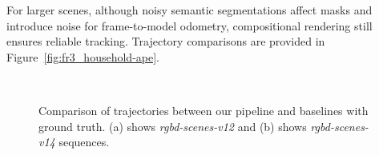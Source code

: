 For larger scenes, although noisy semantic segmentations affect masks and introduce noise for frame-to-model odometry, compositional rendering still ensures reliable tracking. Trajectory comparisons are provided in Figure~\ref{fig:fr3_household-ape}.


\begin{figure}[t!]
    \centering
    \\
    \caption{Comparison of trajectories between our pipeline and baselines with ground truth. (a) shows \emph{rgbd-scenes-v12} and (b) shows \emph{rgbd-scenes-v14} sequences. }
    \vspace*{-1em}
    \label{fig:rgbd_scenes-ape}
\end{figure}
